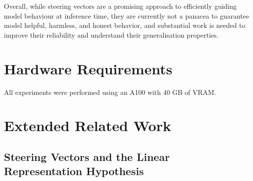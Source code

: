\documentclass{article}
\begin{document}

Overall, while steering vectors are a promising approach to efficiently guiding model behaviour at inference time, they are currently not a panacea to guarantee model helpful, harmless, and honest behavior, and substantial work is needed to improve their reliability and understand their generalisation properties.







































\newpage



\newpage

\appendix

\section{Hardware Requirements}\label{sec:compute}
All experiments were performed using an A100 with 40 GB of VRAM. 


\section{Extended Related Work}\label{sec:app_rw}

\subsection{Steering Vectors and the Linear Representation Hypothesis}
\end{document}
